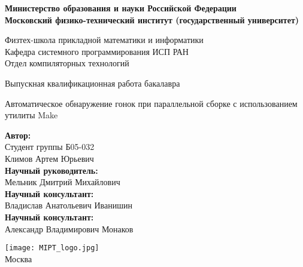 \begin{center}
    \large\textbf{Министерство образования и науки Российской Федерации \\
    Московский физико-технический институт (государственный
    университет)} \\
    \vspace{1cm}

    Физтех-школа прикладной математики и информатики \\

    Кафедра системного программирования ИСП РАН \\
    Отдел компиляторных технологий\\

    \vspace{3em}

    Выпускная квалификационная работа бакалавра
\end{center}

\begin{center}
    \vspace{\fill}
    \LARGE{Автоматическое обнаружение гонок при параллельной сборке с использованием утилиты Make}

    \vspace{\fill}
\end{center}


\begin{flushright}
    \textbf{Автор:} \\
    Студент группы Б05-032 \\
    Климов Артем Юрьевич \\
    \vspace{2em}
    \textbf{Научный руководитель:} \\
    Мельник Дмитрий Михайлович \\
    \vspace{2em}
    \textbf{Научный консультант:} \\
    Владислав Анатольевич Иванишин \\
    \vspace{2em}
    \textbf{Научный консультант:} \\
    Александр Владимирович Монаков \\
\end{flushright}

\vspace{7em}

\begin{center}
    \texttt{[image: MIPT\_logo.jpg]}\\
    Москва \the\year{}
\end{center}

\thispagestyle{empty}

\newpage
\setcounter{page}{2}
\fancyfoot[c]{\thepage}
\fancyhead[R]{}